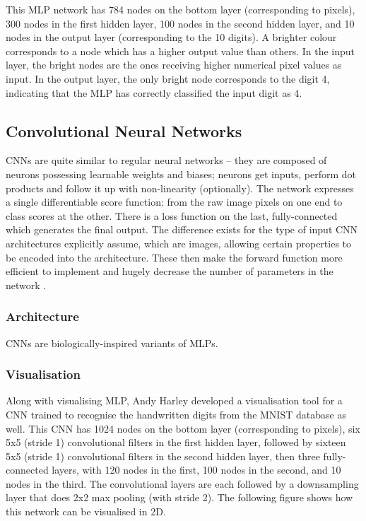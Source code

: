 This MLP network has 784 nodes on the bottom layer (corresponding to pixels), 300 nodes in the first hidden layer, 100 nodes in the second hidden layer, and 10 nodes in the output layer (corresponding to the 10 digits)\cite{harley2015isvc}. \newline\newline
A brighter colour corresponds to a node which has a higher output value than others. In the input layer, the bright nodes are the ones receiving higher numerical pixel values as input. In the output layer, the only bright node corresponds to the digit 4, indicating that the MLP has correctly classified the input digit as 4.

\subsection{Convolutional Neural Networks}
\label{sect5_1_2}
CNNs are quite similar to regular neural networks – they are composed of neurons possessing learnable weights and biases; neurons get inputs, perform dot products and follow it up with non-linearity (optionally). The network expresses a single differentiable score function: from the raw image pixels on one end to class scores at the other. There is a loss function on the last, fully-connected which generates the final output. The difference exists for the type of input CNN architectures explicitly assume, which are images, allowing certain properties to be encoded into the architecture. These then make the forward function more efficient to implement and hugely decrease the number of parameters in the network \cite{cnn_stanford}.

\subsubsection{Architecture}
\label{sect5_1_2_1}
CNNs are biologically-inspired variants of MLPs. 



\subsubsection{Visualisation}
\label{sect5_1_2_2}
Along with visualising \ac{MLP}, Andy Harley developed a visualisation tool for a CNN trained to recognise the handwritten digits from the MNIST database \cite{harley2015isvc} as well. \newline\newline
This CNN has 1024 nodes on the bottom layer (corresponding to pixels), six 5x5 (stride 1) convolutional filters in the first hidden layer, followed by sixteen 5x5 (stride 1) convolutional filters in the second hidden layer, then three fully-connected layers, with 120 nodes in the first, 100 nodes in the second, and 10 nodes in the third. The convolutional layers are each followed by a downsampling layer that does 2x2 max pooling (with stride 2)\cite{harley2015isvc}. \newline\newline
The following figure shows how this network can be visualised in 2D.

